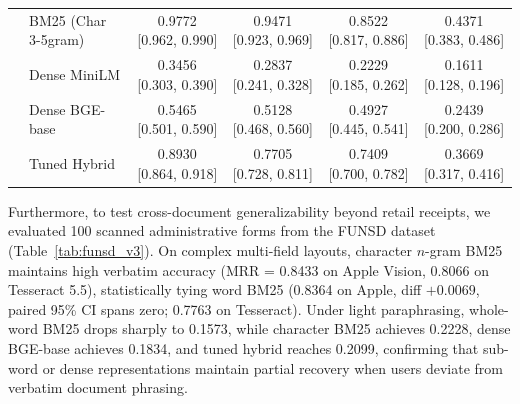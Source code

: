 \documentclass[conference]{IEEEtran}
\begin{document}
\begin{table}[t]
{\begin{tabular}{llcccc}
  & BM25 (Char 3-5gram)     & 0.9772 [0.962, 0.990] & 0.9471 [0.923, 0.969] & 0.8522 [0.817, 0.886] & 0.4371 [0.383, 0.486] \\
  & Dense MiniLM            & 0.3456 [0.303, 0.390] & 0.2837 [0.241, 0.328] & 0.2229 [0.185, 0.262] & 0.1611 [0.128, 0.196] \\
  & Dense BGE-base          & 0.5465 [0.501, 0.590] & 0.5128 [0.468, 0.560] & 0.4927 [0.445, 0.541] & 0.2439 [0.200, 0.286] \\
  & Tuned Hybrid            & 0.8930 [0.864, 0.918] & 0.7705 [0.728, 0.811] & 0.7409 [0.700, 0.782] & 0.3669 [0.317, 0.416] \\
\bottomrule
\end{tabular}}
\end{table}

Furthermore, to test cross-document generalizability beyond retail receipts, we evaluated 100 scanned administrative forms from the FUNSD dataset \cite{jaume2019funsd} (Table~\ref{tab:funsd_v3}). On complex multi-field layouts, character $n$-gram BM25 maintains high verbatim accuracy (MRR = 0.8433 on Apple Vision, 0.8066 on Tesseract 5.5), statistically tying word BM25 (0.8364 on Apple, diff $+0.0069$, paired 95\% CI spans zero; 0.7763 on Tesseract). Under light paraphrasing, whole-word BM25 drops sharply to 0.1573, while character BM25 achieves 0.2228, dense BGE-base achieves 0.1834, and tuned hybrid reaches 0.2099, confirming that sub-word or dense representations maintain partial recovery when users deviate from verbatim document phrasing.
\end{document}
